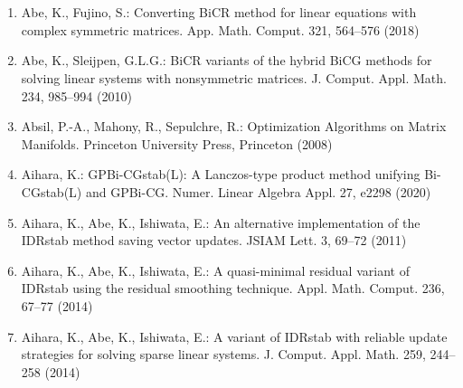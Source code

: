 \clearpage\section*{}
\makeatletter{}\label{chap:references}\makeatother
\begin{enumerate}[label=\arabic*.,ref=\arabic*,leftmargin=3em]

\item\label{bib:source-1}Abe, K., Fujino, S.: Converting BiCR method for linear equations with complex symmetric matrices. App. Math. Comput. 321, 564–576 (2018)

\item\label{bib:source-2}Abe, K., Sleijpen, G.L.G.: BiCR variants of the hybrid BiCG methods for solving linear systems with nonsymmetric matrices. J. Comput. Appl. Math. 234, 985–994 (2010)

\item\label{bib:source-3}Absil, P.-A., Mahony, R., Sepulchre, R.: Optimization Algorithms on Matrix Manifolds. Princeton University Press, Princeton (2008)

\item\label{bib:source-4}Aihara, K.: GPBi-CGstab(L): A Lanczos-type product method unifying Bi-CGstab(L) and GPBi-CG. Numer. Linear Algebra Appl. 27, e2298 (2020)

\item\label{bib:source-5}Aihara, K., Abe, K., Ishiwata, E.: An alternative implementation of the IDRstab method saving vector updates. JSIAM Lett. 3, 69–72 (2011)

\item\label{bib:source-6}Aihara, K., Abe, K., Ishiwata, E.: A quasi-minimal residual variant of IDRstab using the residual smoothing technique. Appl. Math. Comput. 236, 67–77 (2014)

\item\label{bib:source-7}Aihara, K., Abe, K., Ishiwata, E.: A variant of IDRstab with reliable update strategies for solving sparse linear systems. J. Comput. Appl. Math. 259, 244–258 (2014)


\end{enumerate}
